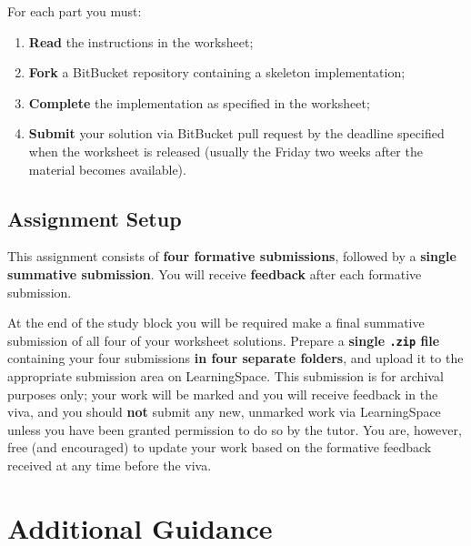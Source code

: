 \documentclass{../../fal_assignment}
\begin{document}
For each part you must:
\begin{enumerate}[label=(\roman*)]
	\item \textbf{Read} the instructions in the worksheet;
	\item \textbf{Fork} a BitBucket repository containing a skeleton implementation;
	\item \textbf{Complete} the implementation as specified in the worksheet;
	\item \textbf{Submit} your solution via BitBucket pull request by the deadline specified when the worksheet is released (usually the Friday two weeks after the material becomes available).
\end{enumerate}

\subsection*{Assignment Setup} 

This assignment consists of \textbf{four formative submissions}, followed by a \textbf{single summative submission}.
You will receive \textbf{feedback} after each formative submission.

At the end of the study block you will be required make a final summative submission of all four of your worksheet solutions.
Prepare a \textbf{single \texttt{.zip} file} containing your four submissions \textbf{in four separate folders}, and upload it to the appropriate submission area on LearningSpace. 
This submission is for archival purposes only; your work will be marked and you will receive feedback in the viva, and you should \textbf{not} submit any new, unmarked work via LearningSpace unless you have been granted permission to do so by the tutor. You are, however, free (and encouraged) to update your work based on the formative feedback received at any time before the viva.

\paragraph{}

\section*{Additional Guidance}
\end{document}
